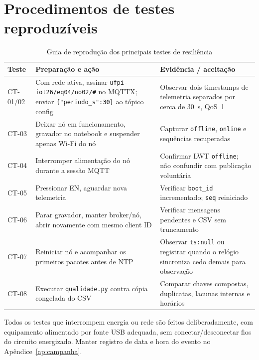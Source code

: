 \chapter{Procedimentos de testes reproduzíveis}\label{ap:testes}
\begin{table}[H]\centering\caption{Guia de reprodução dos principais testes de resiliência}\label{tab:passo-testes}\scriptsize
\begin{tabular}{@{}L{2.1cm}L{5.2cm}L{6.5cm}@{}}\toprule
\textbf{Teste}&\textbf{Preparação e ação}&\textbf{Evidência / aceitação}\\\midrule
CT-01/02&Com rede ativa, assinar \texttt{ufpi-iot26/eq04/no02/\#} no MQTTX; enviar \texttt{\{"periodo\_s":30\}} ao tópico config&Observar dois timestamps de telemetria separados por cerca de 30~s, QoS~1\\
CT-03&Deixar nó em funcionamento, gravador no notebook e suspender apenas Wi-Fi do nó&Capturar \texttt{offline}, \texttt{online} e sequências recuperadas\\
CT-04&Interromper alimentação do nó durante a sessão MQTT&Confirmar LWT \texttt{offline}; não confundir com publicação voluntária\\
CT-05&Pressionar EN, aguardar nova telemetria&Verificar \texttt{boot\_id} incrementado; \texttt{seq} reiniciado\\
CT-06&Parar gravador, manter broker/nó, abrir novamente com mesmo client ID&Verificar mensagens pendentes e CSV sem truncamento\\
CT-07&Reiniciar nó e acompanhar os primeiros pacotes antes de NTP&Observar \texttt{ts:null} ou registrar quando o relógio sincroniza cedo demais para observação\\
CT-08&Executar \texttt{qualidade.py} contra cópia congelada do CSV&Comparar chaves compostas, duplicatas, lacunas internas e horários\\
\bottomrule\end{tabular}\end{table}
Todos os testes que interrompem energia ou rede são feitos deliberadamente, com equipamento alimentado por fonte USB adequada, sem conectar/desconectar fios do circuito energizado. Manter registro de data e hora do evento no Apêndice~\ref{ap:campanha}.
